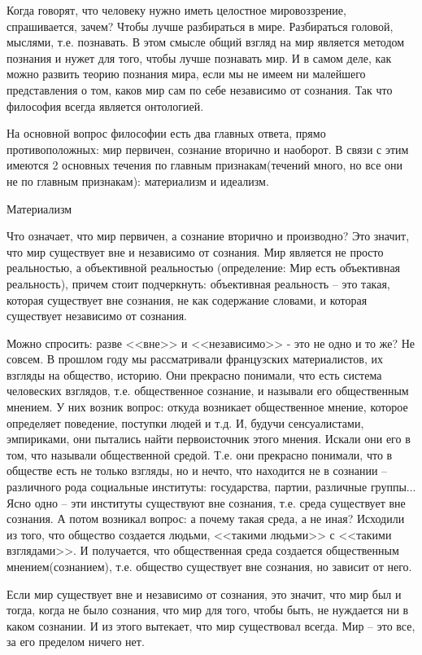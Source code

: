 Когда говорят, что человеку нужно иметь целостное мировоззрение, спрашивается, зачем? Чтобы лучше разбираться в мире. Разбираться головой, мыслями, т.е. познавать. В этом смысле общий взгляд на мир является методом познания и нужет для того, чтобы лучше познавать мир. И в самом деле, как можно развить теорию познания мира, если мы не имеем ни малейшего представления о том, каков мир сам по себе независимо от сознания. Так что философия всегда является онтологией.

    На основной вопрос философии есть два главных ответа, прямо противоположных: мир первичен, сознание вторично и наоборот. В связи с этим имеются 2 основных течения по главным признакам(течений много, но все они не по главным признакам): материализм и идеализм.

Материализм

Что означает, что мир первичен, а сознание вторично и производно? Это значит, что мир существует вне и независимо от сознания. Мир является не просто реальностью, а объективной реальностью (определение: Мир есть объективная реальность), причем стоит подчеркнуть: объективная реальность – это такая, которая существует вне сознания, не как содержание словами, и которая существует независимо от сознания.

Можно спросить: разве <<вне>> и <<независимо>> - это не одно и то же? Не совсем. В прошлом году мы рассматривали французских материалистов, их взгляды на общество, историю. Они прекрасно понимали, что есть система человеских взглядов, т.е. общественное сознание, и называли его общественным мнением. У них возник вопрос: откуда возникает общественное мнение, которое определяет поведение, поступки людей и т.д. И, будучи сенсуалистами, эмпириками, они пытались найти первоисточник этого мнения. Искали они его в том, что называли общественной средой. Т.е. они прекрасно понимали, что в обществе есть не только взгляды, но и нечто, что находится не в сознании – различного рода социальные институты: государства, партии, различные группы... Ясно одно – эти институты существуют вне сознания, т.е. среда существует вне сознания. А потом возникал вопрос: а почему такая среда, а не иная? Исходили из того, что общество создается людьми, <<такими людьми>> с <<такими взглядами>>. И получается, что общественная среда создается общественным мнением(сознанием), т.е. общество существует вне сознания, но зависит от него.

Если мир существует вне и независимо от сознания, это значит, что мир был и тогда, когда не было сознания, что мир для того, чтобы быть, не нуждается ни в каком сознании. И из этого вытекает, что мир существовал всегда. Мир – это все, за его пределом ничего нет.

